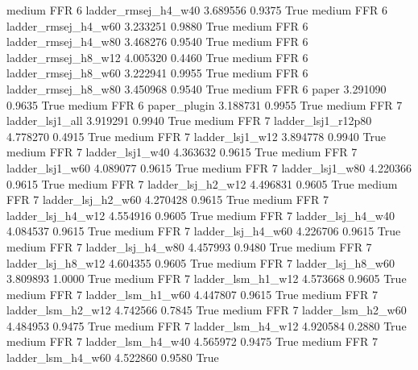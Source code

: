     medium      FFR                 6    ladder_rmsej_h4_w40   3.689556      0.9375    True
    medium      FFR                 6    ladder_rmsej_h4_w60   3.233251      0.9880    True
    medium      FFR                 6    ladder_rmsej_h4_w80   3.468276      0.9540    True
    medium      FFR                 6    ladder_rmsej_h8_w12   4.005320      0.4460    True
    medium      FFR                 6    ladder_rmsej_h8_w60   3.222941      0.9955    True
    medium      FFR                 6    ladder_rmsej_h8_w80   3.450968      0.9540    True
    medium      FFR                 6                  paper   3.291090      0.9635    True
    medium      FFR                 6           paper_plugin   3.188731      0.9955    True
    medium      FFR                 7        ladder_lsj1_all   3.919291      0.9940    True
    medium      FFR                 7     ladder_lsj1_r12p80   4.778270      0.4915    True
    medium      FFR                 7        ladder_lsj1_w12   3.894778      0.9940    True
    medium      FFR                 7        ladder_lsj1_w40   4.363632      0.9615    True
    medium      FFR                 7        ladder_lsj1_w60   4.089077      0.9615    True
    medium      FFR                 7        ladder_lsj1_w80   4.220366      0.9615    True
    medium      FFR                 7      ladder_lsj_h2_w12   4.496831      0.9605    True
    medium      FFR                 7      ladder_lsj_h2_w60   4.270428      0.9615    True
    medium      FFR                 7      ladder_lsj_h4_w12   4.554916      0.9605    True
    medium      FFR                 7      ladder_lsj_h4_w40   4.084537      0.9615    True
    medium      FFR                 7      ladder_lsj_h4_w60   4.226706      0.9615    True
    medium      FFR                 7      ladder_lsj_h4_w80   4.457993      0.9480    True
    medium      FFR                 7      ladder_lsj_h8_w12   4.604355      0.9605    True
    medium      FFR                 7      ladder_lsj_h8_w60   3.809893      1.0000    True
    medium      FFR                 7      ladder_lsm_h1_w12   4.573668      0.9605    True
    medium      FFR                 7      ladder_lsm_h1_w60   4.447807      0.9615    True
    medium      FFR                 7      ladder_lsm_h2_w12   4.742566      0.7845    True
    medium      FFR                 7      ladder_lsm_h2_w60   4.484953      0.9475    True
    medium      FFR                 7      ladder_lsm_h4_w12   4.920584      0.2880    True
    medium      FFR                 7      ladder_lsm_h4_w40   4.565972      0.9475    True
    medium      FFR                 7      ladder_lsm_h4_w60   4.522860      0.9580    True
